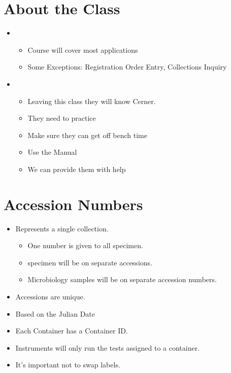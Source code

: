     \section{About the Class}
    \begin{itemize}
        \item {}
            \begin{itemize}
                \item Course will cover most applications
                \item Some Exceptions: Registration Order Entry, Collections Inquiry
            \end{itemize}
        \item {}
            \begin{itemize}
                \item Leaving this class they will  know Cerner.
                \item They need to practice
                \item Make sure they can get off bench time
                \item Use the Manual
                \item We can provide them with help
            \end{itemize}
    \end{itemize}
    \section{Accession Numbers}
        \begin{itemize}
            \item Represents a single collection.
                \begin{itemize}
                    \item One number is given to all  specimen.
                    \item {} specimen will be on separate accessions.
                    \item Microbiology samples will be on separate accession numbers.
                \end{itemize}
            \item Accessions are unique.
            \item Based on the Julian Date
        \end{itemize}
        \begin{itemize}
            \item Each Container has a Container ID.
            \item Instruments will only run the tests assigned to a container.
            \item It's important not to swap labels.
        \end{itemize}
